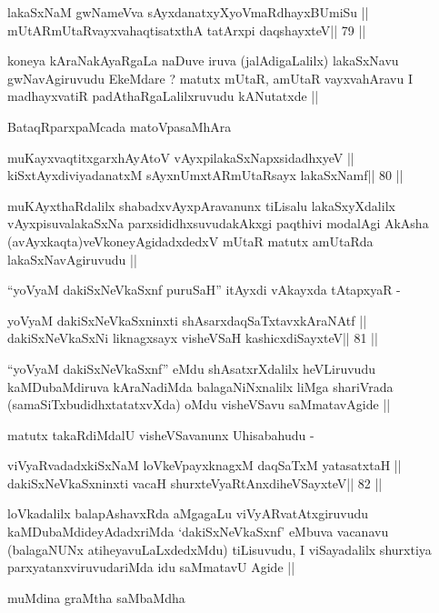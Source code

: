 \begin{shl}
lakaSxNaM gwNameVva sAyxdanatxyXyoV\footnotemark[3]maRdhayxBUmiSu ||
mUtARmUtaRvayxvahaqtisatxthA tatArxpi daqshayxteV\hfill || 79 ||
\end{shl}

\begin{artha}
koneya kAraNakAyaRgaLa naDuve iruva (jalAdigaLalilx) lakaSxNavu
gwNavAgiruvudu EkeMdare ? matutx mUtaR, amUtaR vayxvahAravu I
madhayxvatiR padAthaRgaLalilxruvudu kANutatxde ||

BataqRparxpaMcada matoVpasaMhAra
\end{artha}

\begin{shl}
muKayxvaqtitxgarxhAyAtoV vAyxpilakaSxNapxsidadhxyeV ||
kiSxtAyxdiviyadanatxM sAyxnUmxtARmUtaRsayx lakaSxNamf\hfill || 80 ||
\end{shl}

\begin{artha}
muKAyxthaRdalilx shabadxvAyxpAravanunx tiLisalu lakaSxyXdalilx
vAyxpisuvalakaSxNa parxsididhxsuvudakAkxgi paqthivi modalAgi AkAsha
(avAyxkaqta)veVkoneyAgidadxdedxV mUtaR matutx amUtaRda
lakaSxNavAgiruvudu ||

``yoV\s yaM dakiSxNeV\s kaSxnf puruSaH'' itAyxdi vAkayxda tAtapxyaR -
\end{artha}

\begin{shl}
yoV\s yaM dakiSxNeV\s kaSxninxti shAsarxdaqSaTxtavxkAraNAtf ||
dakiSxNeV\s kaSxNi liknagxsayx visheVSaH kashicxdiSayxteV\hfill || 81 ||
\end{shl}

\begin{artha}
``yoV\s yaM dakiSxNeV\s kaSxnf'' eMdu shAsatxrXdalilx heVLiruvudu
  kaMDubaMdiruva kAraNadiMda balagaNiNxnalilx liMga shariVrada
  (samaSiTxbudidhxtatatxvXda) oMdu visheVSavu saMmatavAgide ||

matutx takaRdiMdalU visheVSavanunx Uhisabahudu -
\end{artha}

\begin{shl}
viVyaRvadadxkiSxNaM loVkeV\s payxknagxM daqSaTxM yatasatxtaH ||
dakiSxNeV\s kaSxninxti vacaH shurxteVyaRtAnxdiheVSayxteV\hfill || 82 ||
\end{shl}

\begin{artha}
loVkadalilx balapAshavxRda aMgagaLu viVyARvatAtxgiruvudu
kaMDubaMdideyAdadxriMda `dakiSxNeV\s kaSxnf' eMbuva vacanavu
(balagaNUNx atiheyavuLaLxdedxMdu) tiLisuvudu, I viSayadalilx shurxtiya
parxyatanxviruvudariMda idu saMmatavU Agide ||

muMdina graMtha saMbaMdha
\end{artha}

